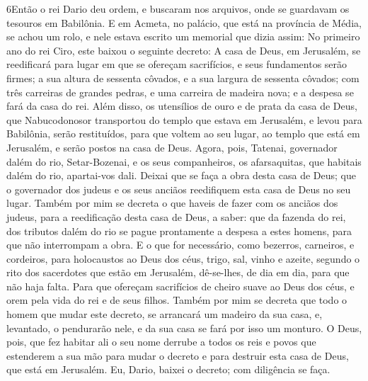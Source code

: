 \lettrine{6} Então o rei Dario deu ordem, e buscaram nos
arquivos, onde se guardavam os tesouros em Babilônia. E em
Acmeta, no palácio, que está na província de Média, se achou um
rolo, e nele estava escrito um memorial que dizia assim: No
primeiro ano do rei Ciro, este baixou o seguinte decreto: A casa de
Deus, em Jerusalém, se reedificará para lugar em que se ofereçam
sacrifícios, e seus fundamentos serão firmes; a sua altura de
sessenta côvados, e a sua largura de sessenta côvados; com três
carreiras de grandes pedras, e uma carreira de madeira nova; e a
despesa se fará da casa do rei. Além disso, os utensílios de
ouro e de prata da casa de Deus, que Nabucodonosor transportou do
templo que estava em Jerusalém, e levou para Babilônia, serão
restituídos, para que voltem ao seu lugar, ao templo que está em
Jerusalém, e serão postos na casa de Deus. Agora, pois, Tatenai,
governador dalém do rio, Setar-Bozenai, e os seus companheiros, os
afarsaquitas, que habitais dalém do rio, apartai-vos dali.
Deixai que se faça a obra desta casa de Deus; que o governador
dos judeus e os seus anciãos reedifiquem esta casa de Deus no seu
lugar. Também por mim se decreta o que haveis de fazer com os
anciãos dos judeus, para a reedificação desta casa de Deus, a saber:
que da fazenda do rei, dos tributos dalém do rio se pague
prontamente a despesa a estes homens, para que não interrompam a
obra. E o que for necessário, como bezerros, carneiros, e
cordeiros, para holocaustos ao Deus dos céus, trigo, sal, vinho e
azeite, segundo o rito dos sacerdotes que estão em Jerusalém,
dê-se-lhes, de dia em dia, para que não haja falta. Para que
ofereçam sacrifícios de cheiro suave ao Deus dos céus, e orem pela
vida do rei e de seus filhos. Também por mim se decreta que
todo o homem que mudar este decreto, se arrancará um madeiro da sua
casa, e, levantado, o pendurarão nele, e da sua casa se fará por
isso um monturo. O Deus, pois, que fez habitar ali o seu nome
derrube a todos os reis e povos que estenderem a sua mão para mudar
o decreto e para destruir esta casa de Deus, que está em Jerusalém.
Eu, Dario, baixei o decreto; com diligência se faça.

